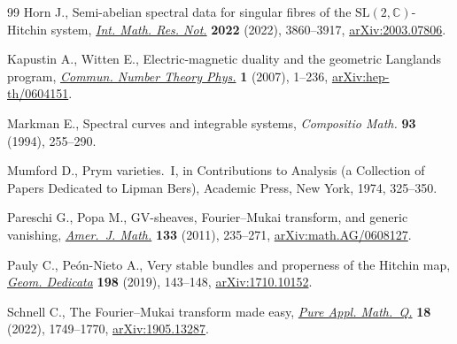 \documentclass[10pt,a4paper]{amsart}
\numberwithin{equation}{section}
\theoremstyle{definition}
\begin{document}
\begin{thebibliography}{99}
Horn J., Semi-abelian spectral data for singular fibres of the
 {$\mathrm{SL}(2,\mathbb C)$}-{H}itchin system,
 \href{https://doi.org/10.1093/imrn/rnaa273}{\textit{Int. Math. Res. Not.}}
 \textbf{2022} (2022), 3860--3917,
 \href{http://arxiv.org/abs/2003.07806}{arXiv:2003.07806}.

Kapustin A., Witten E., Electric-magnetic duality and the geometric {L}anglands
 program, \href{https://doi.org/10.4310/CNTP.2007.v1.n1.a1}{\textit{Commun.
 Number Theory Phys.}} \textbf{1} (2007), 1--236,
 \href{http://arxiv.org/abs/hep-th/0604151}{arXiv:hep-th/0604151}.

Markman E., Spectral curves and integrable systems, \textit{Compositio Math.}
 \textbf{93} (1994), 255--290.

Mumford D., Prym varieties.~{I}, in Contributions to Analysis (a Collection of
 Papers Dedicated to {L}ipman {B}ers), Academic Press, New York, 1974,
 325--350.

Pareschi G., Popa M., G{V}-sheaves, {F}ourier--{M}ukai transform, and generic
 vanishing, \href{https://doi.org/10.1353/ajm.2011.0000}{\textit{Amer.~J.
 Math.}} \textbf{133} (2011), 235--271,
 \href{http://arxiv.org/abs/math.AG/0608127}{arXiv:math.AG/0608127}.

Pauly C., Pe\'{o}n-Nieto A., Very stable bundles and properness of the
 {H}itchin map, \href{https://doi.org/10.1007/s10711-018-0333-6}{\textit{Geom.
 Dedicata}} \textbf{198} (2019), 143--148,
 \href{http://arxiv.org/abs/1710.10152}{arXiv:1710.10152}.

Schnell C., The {F}ourier--{M}ukai transform made easy,
 \href{https://doi.org/10.4310/pamq.2022.v18.n4.a14}{\textit{Pure Appl.
 Math.~Q.}} \textbf{18} (2022), 1749--1770,
 \href{http://arxiv.org/abs/1905.13287}{arXiv:1905.13287}.

\end{thebibliography}
\end{document}
